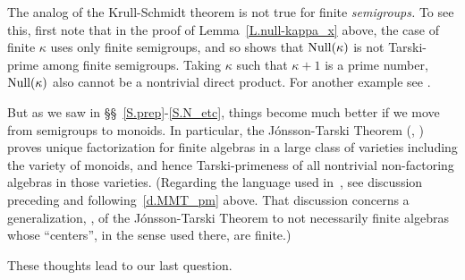 \documentclass{amsart}
\numberwithin{equation}{section}
\numberwithin{theorem}{section}
\begin{document}
The analog of the Krull-Schmidt theorem is not true for
finite {\em semigroups.}
To see this, first note that in the proof of
Lemma~\ref{L.null-kappa_x} above,
the case of finite $\kappa$ uses only finite semigroups, and so shows
that $\textup{Null}(\kappa)$ is not Tarski-prime among
finite semigroups.
Taking $\kappa$ such that $\kappa\!+\!1$ is a prime number,
$\textup{Null}(\kappa)$ also cannot be a nontrivial direct product.
For another example see \cite[Exercise~4, p.\,265]{MMT}.

But as we saw in \S\S~\ref{S.prep}-\ref{S.N_etc},
things become much better if we move from semigroups to monoids.
In particular, the J\'onsson-Tarski Theorem
(\cite{JT}, \cite[p.\,290]{MMT})
proves unique factorization for finite algebras
in a large class of varieties including the variety of monoids,
and hence Tarski-primeness of all nontrivial non-factoring
algebras in those varieties.
(Regarding the language used in~\cite{MMT}, see discussion
preceding and following~\eqref{d.MMT_pm} above.
That discussion concerns a generalization,
\cite[Exercise~5.15\,(10), p.\,300]{MMT}, of
the J\'onsson-Tarski Theorem to not necessarily
finite algebras whose ``centers'', in the sense used
there, are finite.)

These thoughts lead to our last question.
\end{document}
